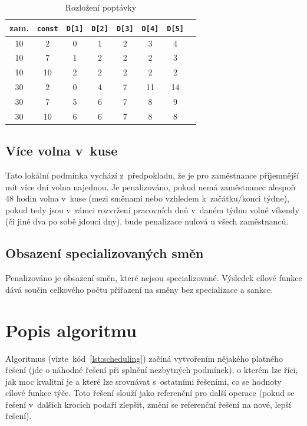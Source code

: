 \documentclass[a4paper,11pt,openany,twoside]{book}
\begin{document}
\begin{table}[h]
	\centering
	\caption{Rozložení poptávky}
	\label{tab:demandfactor}
	\begin{tabular}{c|c|cccccc}
		\hline
		zam. & \texttt{const} & \texttt{D[1]} & \texttt{D[2]} & \texttt{D[3]} & \texttt{D[4]} & \texttt{D[5]} \\
		\hline
		\rowcolor{Gray}
		10 & 2 & 0 & 1 & 2 & 3 & 4 \\
		10 & 7 & 1 & 2 & 2 & 2 & 3 \\
		\rowcolor{Gray}
		10 & 10 & 2 & 2 & 2 & 2 & 2 \\
		30 & 2 & 0 & 4 & 7 & 11 & 14 \\
		\rowcolor{Gray}
		30 & 7 & 5 & 6 & 7 & 8 & 9 \\
		30 & 10 & 6 & 6 & 7 & 8 & 8 \\
		\hline
	\end{tabular}
\end{table}


\subsection{Více volna v~kuse}
Tato lokální podmínka vychází z~předpokladu, že je pro zaměstnance příjemnější mít více dní volna najednou. Je penalizováno, pokud nemá zaměstnanec alespoň 48 hodin volna v~kuse (mezi směnami nebo vzhledem k~začátku/konci týdne), pokud tedy jsou v~rámci rozvržení pracovních dnů v~daném týdnu volné víkendy (či jiné dva po sobě jdoucí dny), bude penalizace nulová u všech zaměstnanců.

\subsection{Obsazení specializovaných směn}
Penalizováno je obsazení směn, které nejsou specializované. Výsledek cílové funkce dává součin celkového počtu přiřazení na směny bez specializace a sankce.

\section{Popis algoritmu}
Algoritmus (vizte~kód~\ref{lst:scheduling}) začíná vytvořením nějakého platného řešení (jde o náhodné řešení při splnění nezbytných podmínek), o kterém lze říci, jak moc kvalitní je a které lze srovnávat s~ostatními řešeními, co se hodnoty cílové funkce týče. Toto řešení slouží jako referenční pro další operace (pokud se řešení v~dalších krocích podaří zlepšit, změní se referenční řešení na nové, lepší řešení).
\end{document}
